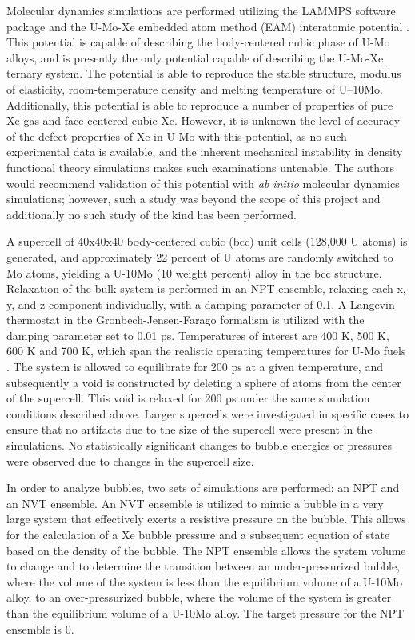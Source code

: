 \documentclass[review]{elsarticle}
\begin{document}
Molecular dynamics simulations are performed utilizing the LAMMPS \cite{plimpton1995} software package and the U-Mo-Xe embedded atom method (EAM) interatomic potential \cite{smirnovaUMo}. This potential is capable of describing the body-centered cubic phase of U-Mo alloys, and is presently the only potential capable of describing the U-Mo-Xe ternary system. The potential is able to reproduce the stable structure, modulus of elasticity, room-temperature density and melting temperature of U–10Mo. Additionally, this potential is able to reproduce a number of properties of pure Xe gas and face-centered cubic Xe. However, it is unknown the level of accuracy of the defect properties of Xe in U-Mo with this potential, as no such experimental data is available, and the inherent mechanical instability in density functional theory simulations makes such examinations untenable. The authors would recommend validation of this potential with \textit{ab initio} molecular dynamics simulations; however, such a study was beyond the scope of this project and additionally no such study of the kind has been performed. 

A supercell of 40x40x40 body-centered cubic (bcc) unit cells (128,000 U atoms) is generated, and approximately 22 percent of U atoms are randomly switched to Mo atoms, yielding a U-10Mo (10 weight percent) alloy in the bcc structure. Relaxation of the bulk system is performed in an NPT-ensemble, relaxing each x, y, and z component individually, with a damping parameter of 0.1. A Langevin thermostat in the Gronbech-Jensen-Farago \cite{gjf2013, gjf2014} formalism is utilized with the damping parameter set to 0.01 ps. Temperatures of interest are 400 K, 500 K, 600 K and 700 K, which span the realistic operating temperatures for U-Mo fuels \cite{umo_prelim_report2017}. The system is allowed to equilibrate for 200 ps at a given temperature, and subsequently a void is constructed by deleting a sphere of atoms from the center of the supercell. This void is relaxed for 200 ps under the same simulation conditions described above. Larger supercells were investigated in specific cases to ensure that no artifacts due to the size of the supercell were present in the simulations. No statistically significant changes to bubble energies or pressures were observed due to changes in the supercell size. 

In order to analyze bubbles, two sets of simulations are performed: an NPT and an NVT ensemble. An NVT ensemble is utilized to mimic a bubble in a very large system that effectively exerts a resistive pressure on the bubble. This allows for the calculation of a Xe bubble pressure and a subsequent equation of state based on the density of the bubble. The NPT ensemble allows the system volume to change and to determine the transition between an under-pressurized bubble, where the volume of the system is less than the equilibrium volume of a U-10Mo alloy, to an over-pressurized bubble, where the volume of the system is greater than the equilibrium volume of a U-10Mo alloy. The target pressure for the NPT ensemble is 0. 
\end{document}

